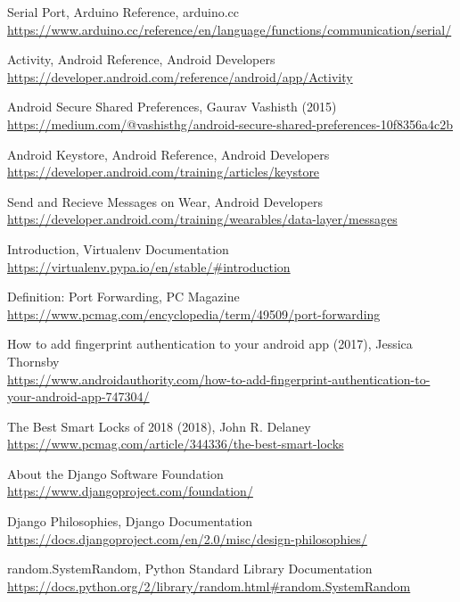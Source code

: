 \begin{thebibliography}{99}
Serial Port, Arduino Reference, arduino.cc\\
\url{https://www.arduino.cc/reference/en/language/functions/communication/serial/}

Activity, Android Reference, Android Developers\\
\url{https://developer.android.com/reference/android/app/Activity}

Android Secure Shared Preferences, Gaurav Vashisth (2015)\\
\url{https://medium.com/@vashisthg/android-secure-shared-preferences-10f8356a4c2b}

Android Keystore, Android Reference, Android Developers\\
\url{https://developer.android.com/training/articles/keystore}

Send and Recieve Messages on Wear, Android Developers\\
\url{https://developer.android.com/training/wearables/data-layer/messages}

Introduction, Virtualenv Documentation\\
\url{https://virtualenv.pypa.io/en/stable/#introduction}

Definition: Port Forwarding, PC Magazine\\
\url{https://www.pcmag.com/encyclopedia/term/49509/port-forwarding}

How to add fingerprint authentication to your android app (2017), Jessica Thornsby\\
\url{https://www.androidauthority.com/how-to-add-fingerprint-authentication-to-your-android-app-747304/}

The Best Smart Locks of 2018 (2018), John R. Delaney\\
\url{https://www.pcmag.com/article/344336/the-best-smart-locks}

About the Django Software Foundation\\
\url{https://www.djangoproject.com/foundation/}

Django Philosophies, Django Documentation\\
\url{https://docs.djangoproject.com/en/2.0/misc/design-philosophies/}

random.SystemRandom, Python Standard Library Documentation\\
\url{https://docs.python.org/2/library/random.html#random.SystemRandom}

\end{thebibliography}